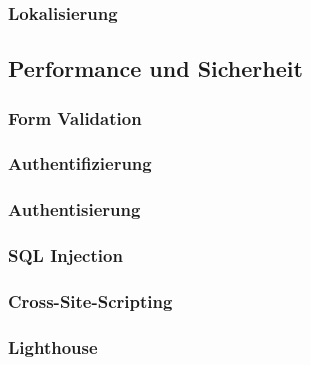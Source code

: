 \subsubsection{Lokalisierung}

\subsection{Performance und Sicherheit}
\subsubsection{Form Validation}
\subsubsection{Authentifizierung}
\subsubsection{Authentisierung}
\subsubsection{SQL Injection}
\subsubsection{Cross-Site-Scripting}
\subsubsection{Lighthouse}